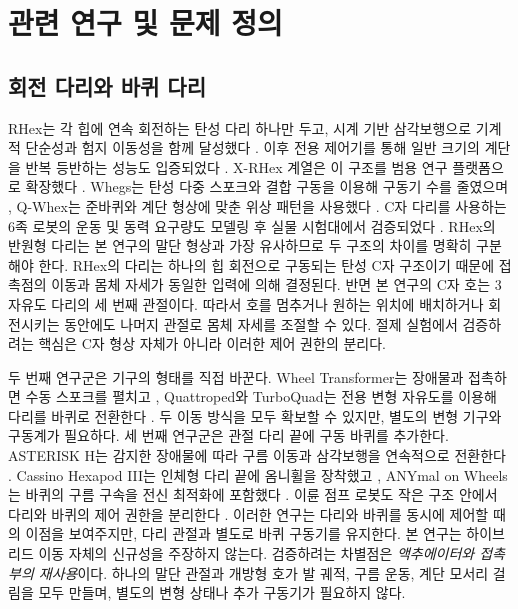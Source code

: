 \section{관련 연구 및 문제 정의}

\subsection{회전 다리와 바퀴 다리}

RHex는 각 힙에 연속 회전하는 탄성 다리 하나만 두고, 시계 기반 삼각보행으로
기계적 단순성과 험지 이동성을 함께 달성했다
\cite{saranli2001rhex,altendorfer2001rhex}. 이후 전용 제어기를 통해 일반 크기의
계단을 반복 등반하는 성능도 입증되었다 \cite{moore2002reliable}. X-RHex 계열은
이 구조를 범용 연구 플랫폼으로 확장했다 \cite{galloway2010xrhex}. Whegs는 탄성 다중 스포크와 결합
구동을 이용해 구동기 수를 줄였으며 \cite{quinn2002whegs}, Q-Whex는 준바퀴와
계단 형상에 맞춘 위상 패턴을 사용했다 \cite{zhang2023qwhex}. C자 다리를 사용하는
6족 로봇의 운동 및 동력 요구량도 모델링 후 실물 시험대에서 검증되었다
\cite{vina2021cleg}. RHex의 반원형
다리는 본 연구의 말단 형상과 가장 유사하므로 두 구조의 차이를 명확히 구분해야
한다. RHex의 다리는 하나의 힙 회전으로 구동되는 탄성 C자 구조이기 때문에
접촉점의 이동과 몸체 자세가 동일한 입력에 의해 결정된다. 반면 본 연구의 C자
호는 3자유도 다리의 세 번째 관절이다. 따라서 호를 멈추거나 원하는 위치에
배치하거나 회전시키는 동안에도 나머지 관절로 몸체 자세를 조절할 수 있다. 절제
실험에서 검증하려는 핵심은 C자 형상 자체가 아니라 이러한 제어 권한의 분리다.

두 번째 연구군은 기구의 형태를 직접 바꾼다. Wheel Transformer는 장애물과
접촉하면 수동 스포크를 펼치고 \cite{kim2014wheeltransformer}, Quattroped와
TurboQuad는 전용 변형 자유도를 이용해 다리를 바퀴로 전환한다
\cite{chen2014quattroped,chen2017turboquad}. 두 이동 방식을 모두 확보할 수
있지만, 별도의 변형 기구와 구동계가 필요하다. 세 번째 연구군은 관절 다리 끝에
구동 바퀴를 추가한다. ASTERISK H는 감지한 장애물에 따라 구름 이동과 삼각보행을
연속적으로 전환한다 \cite{yoshioka2008asterisk}. Cassino Hexapod III는 인체형 다리 끝에 옴니휠을 장착했고
\cite{tedeschi2017cassino}, ANYmal on Wheels는 바퀴의 구름 구속을 전신 최적화에
포함했다 \cite{bjelonic2019keep,bjelonic2021wholebody,hutter2016anymal}.
이륜 점프 로봇도 작은 구조 안에서 다리와 바퀴의 제어 권한을 분리한다
\cite{klemm2019ascento}. 이러한 연구는 다리와 바퀴를 동시에 제어할 때의 이점을
보여주지만, 다리 관절과 별도로 바퀴 구동기를 유지한다. 본 연구는 하이브리드
이동 자체의 신규성을 주장하지 않는다. 검증하려는 차별점은 \emph{액추에이터와
접촉부의 재사용}이다. 하나의 말단 관절과 개방형 호가 발 궤적, 구름 운동, 계단
모서리 걸림을 모두 만들며, 별도의 변형 상태나 추가 구동기가 필요하지 않다.

